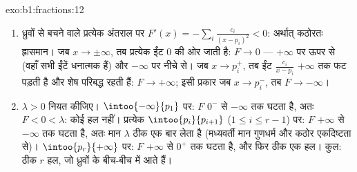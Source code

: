 \begin{solution}{exo:b1:fractions:12}
\begin{enumerate}
  \item ध्रुवों से बचने वाले प्रत्येक अंतराल पर $F'(x) = -\sum_i
  \frac{c_i}{(x - p_i)^2} < 0$: अर्थात् कठोरतः ह्रासमान। जब $x \to
  \pm\infty$, तब प्रत्येक ईंट $0$ की ओर जाती है: $F \to 0$ --- $+\infty$ पर
  ऊपर से (वहाँ सभी ईंटें धनात्मक हैं) और $-\infty$ पर नीचे से। जब $x \to
  p_i^+$, तब ईंट $\frac{c_i}{x - p_i}$ $+\infty$ तक फट पड़ती है और शेष
  परिबद्ध रहती हैं: $F \to +\infty$; इसी प्रकार जब $x \to p_i^-$, तब $F \to
  -\infty$।
  \item $\lambda > 0$ नियत कीजिए। $\intoo{-\infty}{p_1}$ पर: $F$ $0^-$ से
  $-\infty$ तक घटता है, अतः $F < 0 < \lambda$: कोई हल नहीं। प्रत्येक
  $\intoo{p_i}{p_{i+1}}$ ($1 \leq i \leq r-1$) पर: $F$ $+\infty$ से
  $-\infty$ तक घटता है, अतः मान $\lambda$ ठीक एक बार लेता है (मध्यवर्ती मान
  गुणधर्म और कठोर एकदिष्टता से)। $\intoo{p_r}{+\infty}$ पर: $F$ $+\infty$ से
  $0^+$ तक घटता है, और फिर ठीक एक हल। कुल: ठीक $r$ हल, जो ध्रुवों के बीच-बीच
  में आते हैं।
\end{enumerate}
\end{solution}

